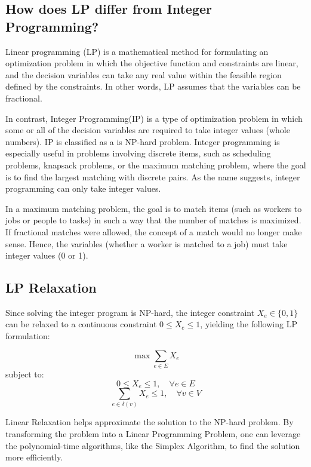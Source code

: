 \subsection{How does LP differ from Integer Programming?}

Linear programming (LP) is a mathematical method for formulating an optimization problem in which the objective function and constraints are linear, and the decision variables can take any real value within the feasible region defined by the constraints. In other words, LP assumes that the variables can be fractional.

In contrast, Integer Programming(IP) is a type of optimization problem in which some or all of the decision variables are required to take integer values (whole numbers). IP is classified as a is NP-hard problem. Integer programming is especially useful in problems involving discrete items, such as scheduling problems, knapsack problems, or the maximum matching problem, where the goal is to find the largest matching with discrete pairs. As the name suggests, integer programming can only take integer values.

In a maximum matching problem, the goal is to match items (such as workers to jobs or people to tasks) in such a way that the number of matches is maximized. If fractional matches were allowed, the concept of a match would no longer make sense. Hence, the variables (whether a worker is matched to a job) must take integer values (0 or 1).

\subsection{LP Relaxation}


Since solving the integer program is NP-hard, the integer constraint \( X_e \in \{0, 1\} \) can be relaxed to a continuous constraint \( 0 \leq X_e \leq 1 \), yielding the following LP formulation:

\begin{equation}
    \max \sum_{e \in E} X_e
\end{equation}
subject to:
\begin{equation}
    0 \leq X_e \leq 1, \quad \forall e \in E
\end{equation}
\begin{equation}
    \sum_{e \in \delta(v)} X_e \leq 1, \quad \forall v \in V
\end{equation}


Linear Relaxation helps approximate the solution to the NP-hard problem. By transforming the problem into a Linear Programming Problem, one can leverage the polynomial-time algorithms, like the Simplex Algorithm, to find the solution more efficiently. \cite{fiveable_linear_programming_relaxation}

